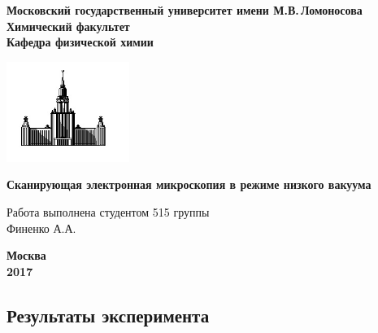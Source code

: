 \documentclass[12pt]{article}
\begin{document}
 

\begin{titlepage}
\centering
\textbf{\large Московский государственный университет имени М.В.\,Ломоносова\\
\vspace*{0.1cm} Химический факультет\\
\vspace*{0.1cm}
\noindent\makebox[\linewidth]{\rule{\paperwidth}{0.4pt}}
\vspace*{0.1cm}
 Кафедра физической химии}
\vspace*{2cm}

\begin{center}
\includegraphics[width=0.3\textwidth]{pictures/logo.jpg}
\end{center}

\vspace*{2cm}
\Large \textbf{Сканирующая электронная микроскопия в режиме низкого вакуума} 
\vspace*{6cm}

\begin{flushright}
\large Работа выполнена студентом 515 группы\\
Финенко А.А.\\
\end{flushright}
\vfill
\large\textbf{Москва\\ 2017}
\end{titlepage}

\subsection*{Результаты эксперимента}
\end{document}
